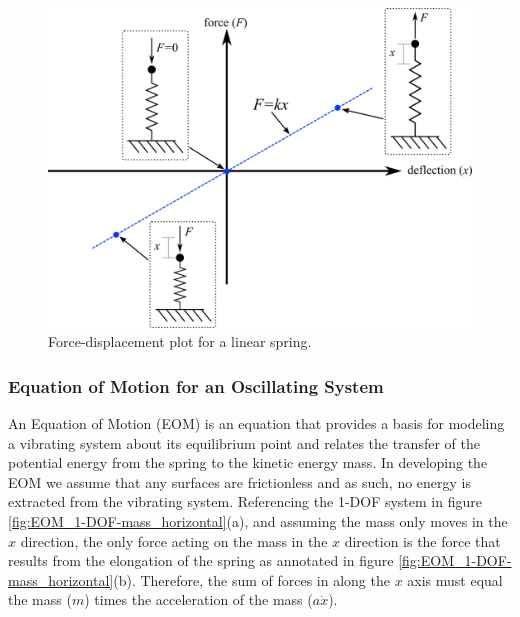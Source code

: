 \documentclass[12pt,letter]{article}
\numberwithin{ex}{section} %
\numberwithin{re}{section} %
\numberwithin{equation}{section}	%
\begin{document}
			\begin{figure}[H]
				\centering
				\includegraphics[]{../figures/linear_spring_deformation.png}
				\caption{Force-displacement plot for a linear spring.}
				\label{fig:linear_spring_deformation}
			\end{figure}					






					
	\subsubsection{Equation of Motion for an Oscillating System}			
			
        An Equation of Motion (EOM) is an equation that provides a basis for modeling a vibrating system about its equilibrium point and relates the transfer of the potential energy from the spring to the kinetic energy mass. In developing the EOM we assume that any surfaces are frictionless and as such, no energy is extracted from the vibrating system. Referencing the 1-DOF system in figure \ref{fig:EOM_1-DOF-mass_horizontal}(a), and assuming the mass only moves in the $x$ direction, the only force acting on the mass in the $x$ direction is the force that results from the elongation of the spring as annotated in figure \ref{fig:EOM_1-DOF-mass_horizontal}(b). Therefore, the sum of forces in along the $x$ axis must equal the mass ($m$) times the acceleration of the mass ($a\dot{x}$). 
\end{document}
